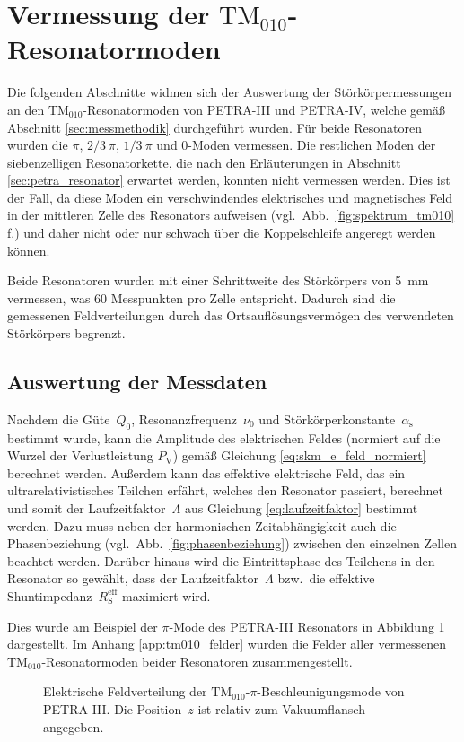 \section{Vermessung der $\mathrm{TM}_{010}$-Resonatormoden}
\label{sec:tm010_messung}
Die folgenden Abschnitte widmen sich der Auswertung der Störkörpermessungen an den $\mathrm{TM}_{010}$-Resonatormoden von PETRA-III und PETRA-IV, welche gemäß Abschnitt \ref{sec:messmethodik} durchgeführt wurden.
Für beide Resonatoren wurden die $\pi,\, 2/3~\pi, \, 1/3~\pi$ und $0$-Moden vermessen.
Die restlichen Moden der siebenzelligen Resonatorkette, die nach den Erläuterungen in Abschnitt \ref{sec:petra_resonator} erwartet werden, konnten nicht vermessen werden.
Dies ist der Fall, da diese Moden ein verschwindendes elektrisches und magnetisches Feld in der mittleren Zelle des Resonators aufweisen (vgl.\ Abb.\ \ref{fig:spektrum_tm010} f.) und daher nicht oder nur schwach über die Koppelschleife angeregt werden können.

Beide Resonatoren wurden mit einer Schrittweite des Störkörpers von \SI{5}{mm} vermessen, was \num{60} Messpunkten pro Zelle entspricht.
Dadurch sind die gemessenen Feldverteilungen durch das Ortsauflösungsvermögen des verwendeten Störkörpers begrenzt.

\subsection{Auswertung der Messdaten}
Nachdem die Güte~$Q_0$, Resonanzfrequenz~$\nu_0$ und Störkörperkonstante~$\alpha_\mathrm{s}$ bestimmt wurde, kann die Amplitude des elektrischen Feldes (normiert auf die Wurzel der Verlustleistung $P_\mathrm{V}$) gemäß Gleichung \eqref{eq:skm_e_feld_normiert} berechnet werden.
Außerdem kann das effektive elektrische Feld, das ein ultrarelativistisches Teilchen erfährt, welches den Resonator passiert, berechnet und somit der Laufzeitfaktor~$\Lambda$ aus Gleichung \eqref{eq:laufzeitfaktor} bestimmt werden.
Dazu muss neben der harmonischen Zeitabhängigkeit auch die Phasenbeziehung (vgl.\ Abb.\ \ref{fig:phasenbeziehung}) zwischen den einzelnen Zellen beachtet werden.
Darüber hinaus wird die Eintrittsphase des Teilchens in den Resonator so gewählt, dass der Laufzeitfaktor~$\Lambda$ bzw.\ die effektive Shuntimpedanz~$R_\mathrm{S}^\mathrm{eff}$ maximiert wird.

Dies wurde am Beispiel der $\pi$-Mode des PETRA-III Resonators in Abbildung \ref{fig:bsp_feld_tm010pi_petra3} dargestellt.
Im Anhang \ref{app:tm010_felder} wurden die Felder aller vermessenen $\mathrm{TM}_{010}$-Resonatormoden beider Resonatoren zusammengestellt.  
\begin{figure}[h]
	\centering
	
	\caption[Elektrische Feldverteilung der $\mathrm{TM}_{010}\text{-}\pi$-Beschleunigungsmode von PETRA-III]{Elektrische Feldverteilung der $\mathrm{TM}_{010}\text{-}\pi$-Beschleunigungsmode von PETRA-III. Die Position~$z$ ist relativ zum Vakuumflansch angegeben.}
	\label{fig:bsp_feld_tm010pi_petra3}
\end{figure}

